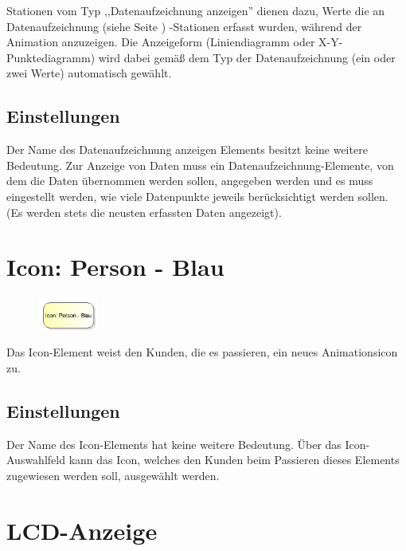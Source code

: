 Stationen vom Typ ,,Datenaufzeichnung anzeigen'' dienen dazu, Werte die an
Datenaufzeichnung (siehe Seite \pageref{ref:ModelElementRecord}) -Stationen erfasst
wurden, während der Animation anzuzeigen. Die Anzeigeform (Liniendiagramm oder
X-Y-Punktediagramm) wird dabei gemäß dem Typ der Datenaufzeichnung (ein oder zwei Werte)
automatisch gewählt.

\subsection*{Einstellungen}

Der Name des Datenaufzeichnung anzeigen Elements besitzt keine weitere Bedeutung.
Zur Anzeige von Daten muss ein Datenaufzeichnung-Elemente, von dem die Daten
übernommen werden sollen, angegeben werden und es muss eingestellt werden, wie
viele Datenpunkte jeweils berücksichtigt werden sollen. (Es werden stets die neusten
erfassten Daten angezeigt).


\section{Icon: Person - Blau}
\label{ref:ModelElementClientIcon}

\begin{figure}
\vspace{-22pt}
\includegraphics[width=2cm]{imageModelElementClientIcon.png}
\vspace{-22pt}
\end{figure}

Das Icon-Element weist den Kunden, die es passieren, ein neues Animationsicon zu.

\subsection*{Einstellungen}

Der Name des Icon-Elements hat keine weitere Bedeutung. Über das Icon-Auswahlfeld kann das Icon,
welches den Kunden beim Passieren dieses Elements zugewiesen werden soll, ausgewählt werden.


\section{LCD-Anzeige}
\label{ref:ModelElementAnimationLCD}

